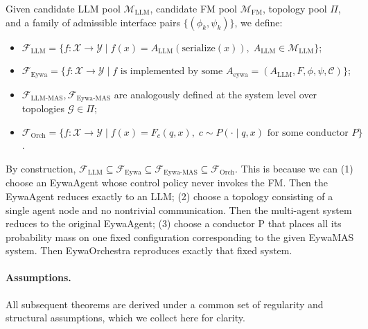 \documentclass{llmxive}
\begin{document}
{\begin{definition}
\label{def:function_classes}
Given candidate LLM pool $\mathcal{M}_{\mathrm{LLM}}$, candidate FM pool $\mathcal{M}_{\mathrm{FM}}$, topology pool $\Pi$, and a family of admissible interface pairs $\{(\phi_k,\psi_k)\}$, we define:
\begin{itemize}
    \item $\mathcal{F}_{\mathrm{LLM}}=\{f:\mathcal{X}\to\mathcal{Y}\mid f(x)=A_{\mathrm{LLM}}(\mathrm{serialize}(x)),\; A_{\mathrm{LLM}}\in\mathcal{M}_{\mathrm{LLM}}\}$;
    \item $\mathcal{F}_{\mathrm{Eywa}}=\{f:\mathcal{X}\to\mathcal{Y}\mid f \text{ is implemented by some } A_{\mathrm{eywa}}=(A_{\mathrm{LLM}},F,\phi,\psi,\mathcal{C})\}$;
    \item $\mathcal{F}_{\mathrm{LLM\text{-}MAS}},\mathcal{F}_{\mathrm{Eywa\text{-}MAS}}$ are analogously defined at the system level over topologies $\mathcal{G}\in\Pi$;
    \item $\mathcal{F}_{\mathrm{Orch}}=\{f:\mathcal{X}\to\mathcal{Y}\mid f(x)=F_{c}(q,x),\;c\sim P(\cdot\mid q,x)\text{ for some conductor }P\}$.
\end{itemize}
\end{definition}
By construction, $\mathcal{F}_{\mathrm{LLM}}\subseteq\mathcal{F}_{\mathrm{Eywa}}\subseteq\mathcal{F}_{\mathrm{Eywa\text{-}MAS}}\subseteq\mathcal{F}_{\mathrm{Orch}}$. This is because we can (1) choose an EywaAgent whose control policy never invokes the FM. Then the EywaAgent reduces exactly to an LLM; (2) choose a topology consisting of a single agent node and no nontrivial communication. Then the multi-agent system reduces to the original EywaAgent; (3) choose a conductor P that places all its probability mass on one fixed configuration corresponding to the given EywaMAS system. Then EywaOrchestra reproduces exactly that fixed system.





\paragraph{Assumptions.}
All subsequent theorems are derived under a common set of regularity and structural assumptions, which we collect here for clarity.


}
\end{document}
